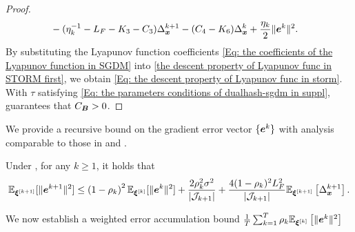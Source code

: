 \begin{proof}
\begin{align}
                                                                     & -(\eta_{k}^{-1}- L_{F}- K_{3}- C_{3}) \Delta_{\bm{x}}^{k+1}- (C_{4}- K_{6}) \Delta_{\bm{x}}^{k}+ \frac{\eta_{k}}{2}\| \bm{e}^{k}\|^{2}.
    \end{align}
    By substituting the Lyapunov function coefficients \eqref{Eq: the coefficients of the Lyapunov function in SGDM}
    into \eqref{the descent property of Lyapunov func in STORM first}, we obtain
    \eqref{Eq: the descent property of Lyapunov func in storm}. With $\tau$ satisfying
    \eqref{Eq: the parameters conditions of dualhash-sgdm in suppl}, 
    guarantees that $C_{\bm{B}}> 0$. 
\end{proof}

We provide a recursive bound on the gradient error vector $\{\bm{e}^{k}\}$ with analysis comparable to those in \cite[Lemma 2]{xu2023momentum} and \cite[Lemma 8]{shi2025momentum}.
\begin{lemma}
    \label{Lemma: Recursive bound on gradient error} Under ,
    for any $k \geq 1$, it holds that
    \begin{align}
        \mathbb{E}_{\bm{\xi}^{[k+1]}}[\| \bm{e}^{k+1}\|^{2}] \leq \left(1 - \rho_{k}\right)^{2}\mathbb{E}_{\bm{\xi}^{[k]}}[\| \bm{e}^{k}\|^{2}] + \frac{2 \rho_{k}^{2}\sigma^{2}}{|\mathcal{J}_{k+1}|}+ \frac{4(1 - \rho_{k})^{2}L_{F}^{2}}{|\mathcal{J}_{k+1}|}\mathbb{E}_{\bm{\xi}^{[k+1]}}\left[\Delta_{\bm{x}}^{k+1}\right]. \notag
    \end{align}
\end{lemma}
We now establish a weighted error accumulation bound
$\frac{1}{T}\sum_{k=1}^{T}\rho_{k}\mathbb{E}_{\bm{\xi}^{[k]}}\left[\|\bm{e}^{k}\|^{2}\right]$
